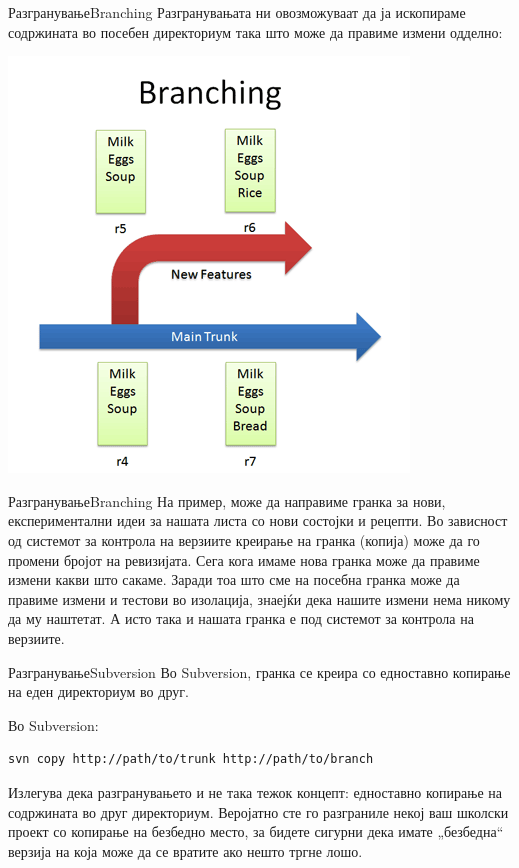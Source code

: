 \begin{frame}{Разгранување}{Branching}
Разгранувањата ни овозможуваат да ја ископираме содржината во посебен
директориум така што може да правиме измени одделно:
\begin{center}
    \includegraphics[scale=0.4]{images/first_branch.png}
\end{center}
\end{frame}

\begin{frame}{Разгранување}{Branching}
На пример, може да направиме гранка за нови, експериментални идеи за нашата
листа со нови состојки и рецепти. Во зависност од системот за
контрола на верзиите креирање на гранка (копија) може да го промени
бројот на ревизијата. Сега кога имаме нова гранка може да правиме
измени какви што сакаме. Заради тоа што сме на посебна гранка може да правиме
измени и тестови во изолација, знаејќи дека нашите измени нема никому да му
наштетат. А исто така и нашата гранка е под системот за контрола на верзиите.
\end{frame}

\begin{frame}[fragile]{Разгранување}{Subversion}
Во Subversion, гранка се креира со едноставно копирање на еден директориум во
друг.
\begin{exampleblock}{Во Subversion:}
\begin{verbatim}
svn copy http://path/to/trunk http://path/to/branch
\end{verbatim}
\end{exampleblock}
\begin{scriptsize}
Излегува дека разгранувањето и не така тежок концепт: едноставно копирање на
содржината во друг директориум. Веројатно сте го разграниле некој ваш школски
проект со копирање на безбедно место, за бидете сигурни дека имате „безбедна“
верзија на која може да се вратите ако нешто тргне лошо.
\end{scriptsize}
\end{frame}


